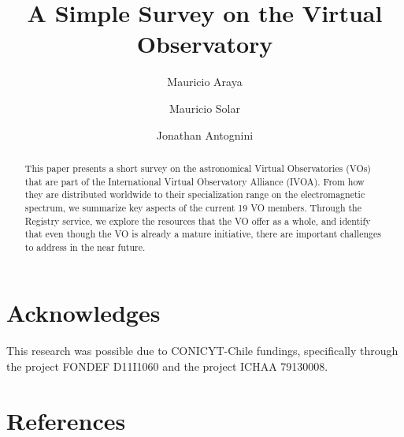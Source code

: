 \documentclass[preprint]{elsarticle}
\begin{document}
\title{A Simple Survey on the Virtual Observatory}

\author[utfsm]{Mauricio Araya}


\author[utfsm]{Mauricio Solar}


\author[utfsm]{Jonathan Antognini}


\address[utfsm]{Universidad T\'ecnica Federico Santa Mar\'ia\\
Avenida Espa\~na 1680, Valpara\'iso, Chile}

\begin{abstract}
This paper presents a short survey on the astronomical Virtual Observatories (VOs) that are 
part of the International Virtual Observatory Alliance (IVOA). From how they are
distributed worldwide to their specialization range on the electromagnetic spectrum, 
we summarize key aspects of the current 19 VO members. Through the Registry
service, we explore the resources that the VO offer as a whole, and identify 
that even though the VO is already a mature initiative, there are important
challenges to address in the near future.
\end{abstract}

\maketitle
















\section*{Acknowledges}
This research was possible due to CONICYT-Chile fundings, specifically 
through the project FONDEF D11I1060 and the project ICHAA 79130008.

\section{References}





%



\end{document}
